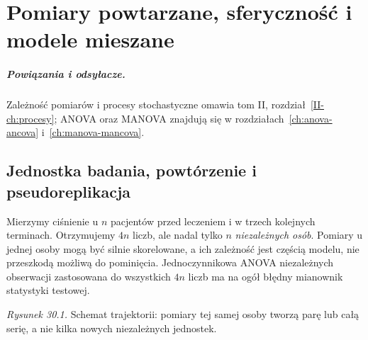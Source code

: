 \chapter{Pomiary powtarzane, sferyczność i modele mieszane}
\label{ch:repeated-measures}
\paragraph{Powiązania i odsyłacze.} Zależność pomiarów i procesy stochastyczne omawia tom II, rozdział~\ref{II-ch:procesy}; ANOVA oraz MANOVA znajdują się w rozdziałach~\ref{ch:anova-ancova} i~\ref{ch:manova-mancova}.


\section{Jednostka badania, powtórzenie i pseudoreplikacja}
Mierzymy ciśnienie u $n$ pacjentów przed leczeniem i w trzech kolejnych terminach. Otrzymujemy $4n$ liczb, ale nadal tylko $n$ \emph{niezależnych osób}. Pomiary u jednej osoby mogą być silnie skorelowane, a ich zależność jest częścią modelu, nie przeszkodą możliwą do pominięcia. Jednoczynnikowa ANOVA niezależnych obserwacji zastosowana do wszystkich $4n$ liczb ma na ogół błędny mianownik statystyki testowej.

\begin{center}

{\small\emph{Rysunek 30.1.} Schemat trajektorii: pomiary tej samej osoby tworzą parę lub całą serię, a nie kilka nowych niezależnych jednostek.}
\end{center}

